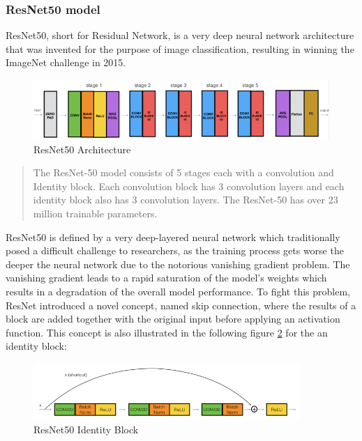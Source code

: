 \subsubsection{ResNet50 model}
ResNet50, short for Residual Network, is a very deep neural network architecture that was invented for the purpose of image classification, resulting in winning the ImageNet challenge in 2015. \citep{Dwivedi:2019:ResNetInKeras}

\begin{figure}[H]
  \begin{center}
  \includegraphics[angle=0, width=1.0\textwidth]{Figures/resnet50.png}
  \caption{ResNet50 Architecture \citep{Dwivedi:2019:ResNetInKeras}}
  \label{fig:ResNet50Architecture}
  \end{center}
\end{figure}

\begin{quote}
    The ResNet-50 model consists of 5 stages each with a convolution and Identity block. Each convolution block has 3 convolution layers and each identity block also has 3 convolution layers. The ResNet-50 has over 23 million trainable parameters. \citep[~para. 14]{Dwivedi:2019:ResNetInKeras}
\end{quote}

ResNet50 is defined by a very deep-layered neural network which traditionally posed a difficult challenge to researchers, as the training process gets worse the deeper the neural network due to the notorious vanishing gradient problem. The vanishing gradient leads to a rapid saturation of the model's weights which results in a degradation of the overall model performance. To fight this problem, ResNet introduced a novel concept, named skip connection, where the results of a block are added together with the original input before applying an activation function. \citep{Dwivedi:2019:ResNetInKeras}
\newline\newline
This concept is also illustrated in the following figure \ref{fig:ResNet50IdentityBlock} for the an identity block:

\begin{figure}[H]
  \begin{center}
  \includegraphics[angle=0, width=0.9\textwidth]{Figures/ResNet50_IdentityBlock.png}
  \caption{ResNet50 Identity Block\citep{Dwivedi:2019:ResNetInKeras}}
  \label{fig:ResNet50IdentityBlock}
  \end{center}
\end{figure}

